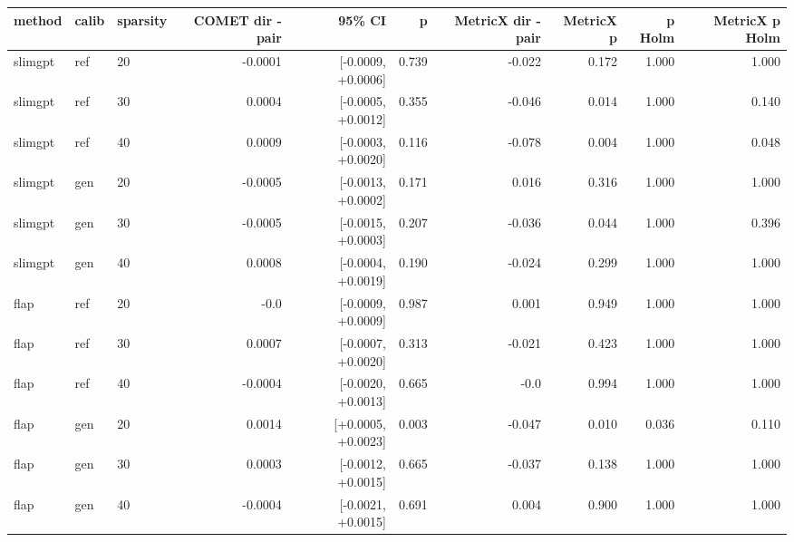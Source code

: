 \begin{tabular}{lllrrrrrrr}
\toprule
method & calib & sparsity & COMET dir - pair & 95\% CI & p & MetricX dir - pair & MetricX p & p Holm & MetricX p Holm \\
\midrule
slimgpt & ref & 20 & -0.0001 & [-0.0009, +0.0006] & 0.739 & -0.022 & 0.172 & 1.000 & 1.000 \\
slimgpt & ref & 30 & 0.0004 & [-0.0005, +0.0012] & 0.355 & -0.046 & 0.014 & 1.000 & 0.140 \\
slimgpt & ref & 40 & 0.0009 & [-0.0003, +0.0020] & 0.116 & -0.078 & 0.004 & 1.000 & 0.048 \\
slimgpt & gen & 20 & -0.0005 & [-0.0013, +0.0002] & 0.171 & 0.016 & 0.316 & 1.000 & 1.000 \\
slimgpt & gen & 30 & -0.0005 & [-0.0015, +0.0003] & 0.207 & -0.036 & 0.044 & 1.000 & 0.396 \\
slimgpt & gen & 40 & 0.0008 & [-0.0004, +0.0019] & 0.190 & -0.024 & 0.299 & 1.000 & 1.000 \\
flap & ref & 20 & -0.0 & [-0.0009, +0.0009] & 0.987 & 0.001 & 0.949 & 1.000 & 1.000 \\
flap & ref & 30 & 0.0007 & [-0.0007, +0.0020] & 0.313 & -0.021 & 0.423 & 1.000 & 1.000 \\
flap & ref & 40 & -0.0004 & [-0.0020, +0.0013] & 0.665 & -0.0 & 0.994 & 1.000 & 1.000 \\
flap & gen & 20 & 0.0014 & [+0.0005, +0.0023] & 0.003 & -0.047 & 0.010 & 0.036 & 0.110 \\
flap & gen & 30 & 0.0003 & [-0.0012, +0.0015] & 0.665 & -0.037 & 0.138 & 1.000 & 1.000 \\
flap & gen & 40 & -0.0004 & [-0.0021, +0.0015] & 0.691 & 0.004 & 0.900 & 1.000 & 1.000 \\
\bottomrule
\end{tabular}
